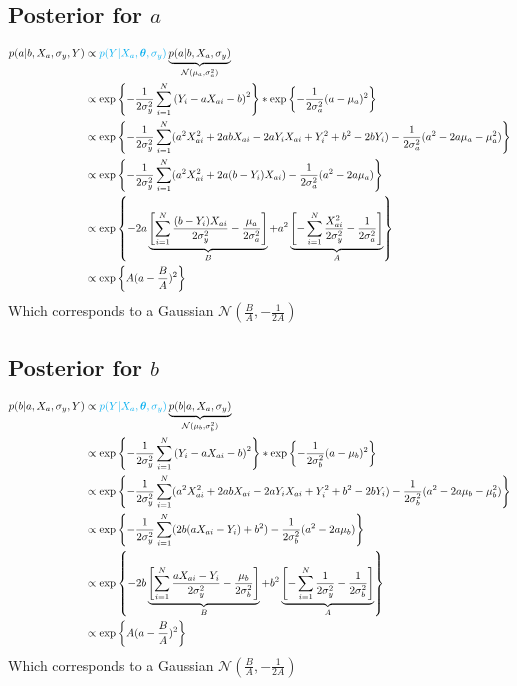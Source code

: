 \documentclass[10pt]{article}
\renewcommand{\vec}[1]{\boldsymbol{#1}}
\begin{document}
\subsection{Posterior for $a$}
\begin{align}
    p(a|b, X_a, \sigma_y, Y) &\propto {\color{cyan} p(Y | X_a, \vec{\theta}, \sigma_y)} \underbrace{p(a | b, X_a, \sigma_{y})}_{\mathcal{N}(\mu_a, \sigma_a^2)} \\
    &\propto \exp\left\{ - \frac{1}{2\sigma_y^2} \sum_{i=1}^N \left( Y_i - a X_{ai} - b \right)^2 \right\} * \exp\left\{ - \frac{1}{2\sigma_a^2} ( a - \mu_a )^2 \right\} \\
    &\propto \exp\left\{ - \frac{1}{2\sigma_y^2} \sum_{i=1}^N (a^2 X_{ai}^2  + 2 a b X_{ai} - 2 a Y_i X_{ai} + Y_i^2 + b^2 -2 b Y_i) - \frac{1}{2\sigma_a^2} ( a^2 - 2 a \mu_a - \mu_a^2 ) \right\} \\
    &\propto \exp\left\{ - \frac{1}{2\sigma_y^2} \sum_{i=1}^N (a^2 X_{ai}^2  + 2 a (b - Y_i) X_{ai} ) - \frac{1}{2\sigma_a^2} ( a^2 - 2 a \mu_a ) \right\} \\
    &\propto \exp\left\{ - 2 a \underbrace{\left[ \sum_{i=1}^N \frac{(b - Y_i) X_{ai}}{2\sigma_y^2} - \frac{\mu_a}{2\sigma_a^2} \right]}_{B} + a^2 \underbrace{\left[ - \sum_{i=1}^N \frac{X_{ai}^2}{2\sigma_y^2}  - \frac{1}{2\sigma_a^2} \right]}_{A} \right\} \\
    &\propto \exp\left\{ A (a - \frac{B}{A})^2\right\}
\end{align}
Which corresponds to a Gaussian $\mathcal{N}(\frac{B}{A}, -\frac{1}{2A})$


\subsection{Posterior for $b$}
\begin{align}
    p(b|a, X_a, \sigma_y, Y) &\propto {\color{cyan} p(Y | X_a, \vec{\theta}, \sigma_y)} \underbrace{p(b | a, X_a, \sigma_{y})}_{\mathcal{N}(\mu_b, \sigma_b^2)} \\
    &\propto \exp\left\{ - \frac{1}{2\sigma_y^2} \sum_{i=1}^N \left( Y_i - a X_{ai} - b \right)^2 \right\} * \exp\left\{ - \frac{1}{2\sigma_b^2} ( a - \mu_b )^2 \right\} \\
    &\propto \exp\left\{ - \frac{1}{2\sigma_y^2} \sum_{i=1}^N (a^2 X_{ai}^2  + 2 a b X_{ai} - 2 a Y_i X_{ai} + Y_i^2 + b^2 -2 b Y_i )- \frac{1}{2\sigma_b^2} ( a^2 - 2 a \mu_b - \mu_b^2 ) \right\} \\
    &\propto \exp\left\{ - \frac{1}{2\sigma_y^2} \sum_{i=1}^N (2 b (a X_{ai} - Y_i) + b^2 ) - \frac{1}{2\sigma_b^2} ( a^2 - 2 a \mu_b ) \right\} \\
    &\propto \exp\left\{ - 2 b \underbrace{\left[ \sum_{i=1}^N \frac{a X_{ai} - Y_i}{2\sigma_y^2} - \frac{\mu_b}{2\sigma_b^2} \right]}_{B} + b^2 \underbrace{\left[ - \sum_{i=1}^N \frac{1}{2\sigma_y^2}  - \frac{1}{2\sigma_b^2} \right]}_{A} \right\} \\
    &\propto \exp\left\{A (a - \frac{B}{A})^2\right\}
\end{align}
Which corresponds to a Gaussian $\mathcal{N}(\frac{B}{A}, -\frac{1}{2A})$
\end{document}
